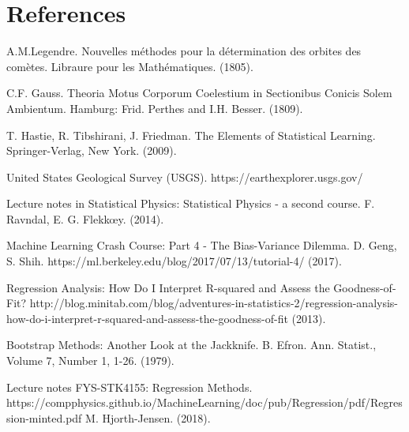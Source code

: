 \newpage
\section{References}

\begingroup
\renewcommand{\section}[2]{}
\begin{thebibliography}{}
	A.M.Legendre. 
	Nouvelles méthodes pour la détermination des orbites des comètes.
	Libraure pour les Mathématiques.
	(1805).
	
	C.F. Gauss. 
	Theoria Motus Corporum Coelestium in Sectionibus Conicis Solem Ambientum. 
	Hamburg: Frid. Perthes and I.H. Besser.
	(1809).
	
	T. Hastie, R. Tibshirani, J. Friedman.
	The Elements of Statistical Learning.
	Springer-Verlag, New York.
	(2009).
	
	United States Geological Survey (USGS).
	https://earthexplorer.usgs.gov/
	
	Lecture notes in Statistical Physics: Statistical Physics - a second course.
	F. Ravndal, E. G. Flekk\oe y.
	(2014).
	
	Machine Learning Crash Course: Part 4 - The Bias-Variance Dilemma.
	D. Geng, S. Shih.
	https://ml.berkeley.edu/blog/2017/07/13/tutorial-4/
	(2017).
	
	Regression Analysis: How Do I Interpret R-squared and Assess the Goodness-of-Fit?
	http://blog.minitab.com/blog/adventures-in-statistics-2/regression-analysis-how-do-i-interpret-r-squared-and-assess-the-goodness-of-fit
	(2013).
	
	Bootstrap Methods: Another Look at the Jackknife.
	B. Efron. 
	Ann. Statist., Volume 7, Number 1, 1-26.
	(1979).
	
	Lecture notes FYS-STK4155: Regression Methods.
	https://compphysics.github.io/MachineLearning/doc/pub/Regression/pdf/Regression-minted.pdf
	M. Hjorth-Jensen.
	(2018).
	
\end{thebibliography}
\endgroup